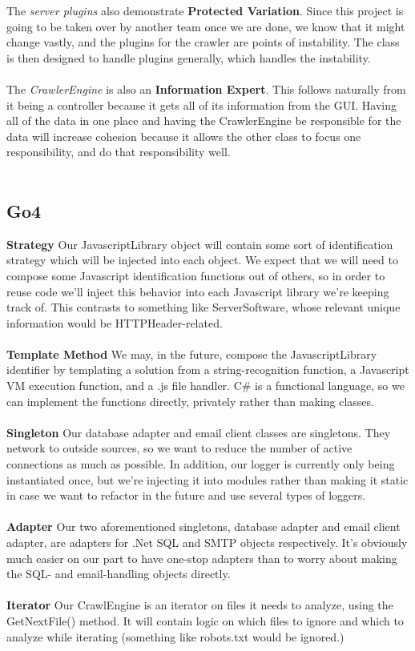 \documentclass{article}
\begin{document}
The \emph{server plugins} also demonstrate \textbf{Protected Variation}. Since this project is going to be taken over by another team once we are done, we know that it might change vastly, and the plugins for the crawler are points of instability. The class is then designed to handle plugins generally, which handles the instability.\\\\
The \emph{CrawlerEngine} is also an \textbf{Information Expert}. This follows naturally from it being a controller because it gets all of its information from the GUI. Having all of the data in one place and having the CrawlerEngine be responsible for the data will increase cohesion because it allows the other class to focus one responsibility, and do that responsibility well.\\\\
\subsection{Go4}
\textbf{Strategy} Our JavascriptLibrary object will contain some sort of identification strategy which will be injected into each object. We expect that we will need to compose some Javascript identification functions out of others, so in order to reuse code we’ll inject this behavior into each Javascript library we’re keeping track of.  This contrasts to something like ServerSoftware, whose relevant unique information would be HTTPHeader-related.\\\\
\textbf{Template Method} We may, in the future, compose the JavascriptLibrary identifier by templating a solution from a string-recognition function, a Javascript VM execution function, and a .js file handler. C\# is a functional language, so we can implement the functions directly, privately rather than making classes.\\\\
\textbf{Singleton} Our database adapter and email client classes are singletons. They network to outside sources, so we want to reduce the number of active connections as much as possible. In addition, our logger is currently only being instantiated once, but we’re injecting it into modules rather than making it static in case we want to refactor in the future and use several types of loggers.\\\\
\textbf{Adapter} Our two aforementioned singletons, database adapter and email client adapter, are adapters for .Net SQL and SMTP objects respectively. It’s obviously much easier on our part to have one-stop adapters than to worry about making the SQL- and email-handling objects directly.\\\\
\textbf{Iterator} Our CrawlEngine is an iterator on files it needs to analyze, using the GetNextFile() method. It will contain logic on which files to ignore and which to analyze while iterating (something like robots.txt would be ignored.) 
\end{document}
